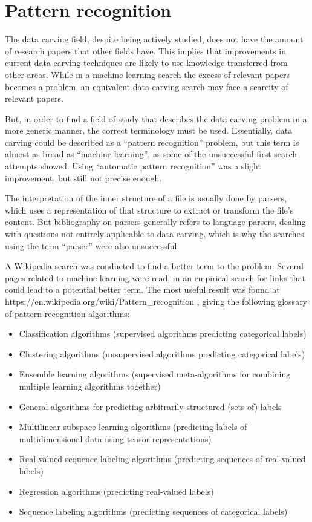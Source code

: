 \section {Pattern recognition}
The data carving field, despite being actively studied, does not have the amount of research papers that other fields have. This implies that improvements in current data carving techniques are likely to use knowledge transferred from other areas. While in a machine learning search the excess of relevant papers becomes a problem, an equivalent data carving search may face a scarcity of relevant papers.

But, in order to find a field of study that describes the data carving problem in a more generic manner, the correct terminology must be used. Essentially, data carving could be described as a  ``pattern recognition'' problem, but this term is almost as broad as ``machine learning'', as some of the unsuccessful first search attempts showed. Using ``automatic pattern recognition'' was a slight improvement, but still not precise enough.

The interpretation of the inner structure of a file is usually done by parsers, which uses a representation of that structure to extract or transform the file's content. But bibliography on parsers generally refers to language parsers, dealing with questions not entirely applicable to data carving, which is why the searches using the term ``parser'' were also unsuccessful.

A Wikipedia search was conducted to find a better term to the problem. Several pages related to machine learning were read, in an empirical search for links that could lead to a potential better term. The most useful result was found at https://en.wikipedia.org/wiki/Pattern\_recognition \cite{wikipedia_editors_pattern_2018}, giving the following glossary of pattern recognition algorithms:

\begin{itemize}
    \item	Classification algorithms (supervised algorithms predicting categorical labels)
    \item	Clustering algorithms (unsupervised algorithms predicting categorical labels)
    \item	Ensemble learning algorithms (supervised meta-algorithms for combining multiple learning algorithms together)
    \item	General algorithms for predicting arbitrarily-structured (sets of) labels
    \item    Multilinear subspace learning algorithms (predicting labels of multidimensional data using tensor representations)
    \item	Real-valued sequence labeling algorithms (predicting sequences of real-valued labels)
    \item	Regression algorithms (predicting real-valued labels)
    \item   Sequence labeling algorithms (predicting sequences of categorical labels)
\end{itemize}

